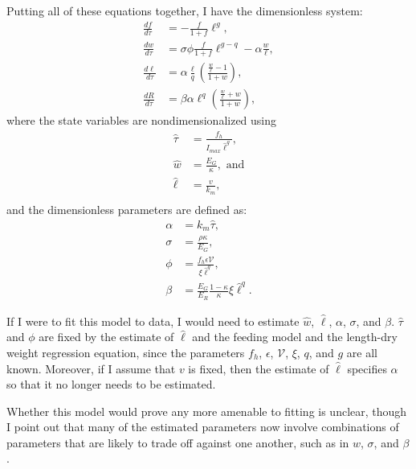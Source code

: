 \documentclass[12pt,reqno,final,pdftex]{amsart}\usepackage[]{graphicx}\usepackage[]{color}
\theoremstyle{plain}
\numberwithin{equation}{part}
\begin{document}
Putting all of these equations together, I have the dimensionless system:
\begin{align}
\frac{df}{d\tau} &= -\frac{f}{1+f}\ell^g, \\
\frac{dw}{d\tau} &= \sigma\phi\frac{f}{1+f}\ell^{g-q}-\alpha\frac{w}{\ell}, \\
\frac{d\ell}{d\tau} &= \alpha \frac{\ell}{q}\left(\frac{\frac{w}{\ell}-1}{1+w}\right), \\
\frac{dR}{d\tau} &= \beta \alpha \ell^q \left(\frac{\frac{w}{\ell}+w}{1+w}\right),
\end{align}
where the state variables are nondimensionalized using
\begin{align}
\hat{\tau} &= \frac{f_h}{I_{max} \hat{\ell}^g}, \\
\hat{w} &= \frac{E_G}{\kappa}, \text{ and}\\
\hat{\ell} &= \frac{v}{k_m}, \\
\end{align}
and the dimensionless parameters are defined as:
\begin{align}
\alpha &= k_m \hat{\tau}, \\
\sigma &= \frac{\rho \kappa}{E_G}, \\
\phi &= \frac{f_h \epsilon \mathcal{V}}{\xi \hat{\ell}^q}, \\
\beta &= \frac{E_G}{E_R}\frac{1-\kappa}{\kappa}\xi\hat{\ell}^q.
\end{align}

If I were to fit this model to data, I would need to estimate $\hat{w}$, $\hat{\ell}$, $\alpha$, $\sigma$, and $\beta$.
$\hat{\tau}$ and $\phi$ are fixed by the estimate of $\hat{\ell}$ and the feeding model and the length-dry weight regression equation, since the parameters $f_h$, $\epsilon$, $\mathcal{V}$, $\xi$, $q$, and $g$ are all known.
Moreover, if I assume that $v$ is fixed, then the estimate of $\hat{\ell}$ specifies $\alpha$ so that it no longer needs to be estimated.

Whether this model would prove any more amenable to fitting is unclear, though I point out that many of the estimated parameters now involve combinations of parameters that are likely to trade off against one another, such as in $\hat{w}$, $\sigma$, and $\beta$.
\end{document}
